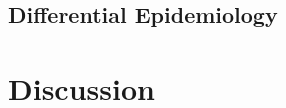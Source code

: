 \documentclass[xcolor=x11names,compress]{beamer}\usepackage[]{graphicx}\usepackage[]{color}
\renewcommand{\(}{\begin{columns}}
\renewcommand{\)}{\end{columns}}
\newcommand{\<}[1]{\begin{column}{#1}}
\renewcommand{\>}{\end{column}}
\begin{document}
\subsection{Differential Epidemiology}



\section{Discussion}



\end{document}
